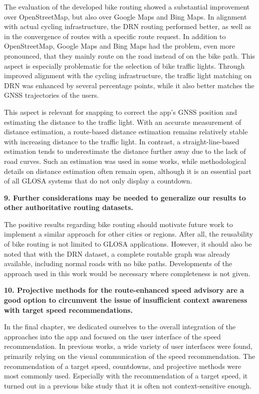 The evaluation of the developed bike routing showed a substantial improvement over OpenStreetMap, but also over Google Maps and Bing Maps. In alignment with actual cycling infrastructure, the DRN routing performed better, as well as in the convergence of routes with a specific route request. In addition to OpenStreetMap, Google Maps and Bing Maps had the problem, even more pronounced, that they mainly route on the road instead of on the bike path. This aspect is especially problematic for the selection of bike traffic lights. Through improved alignment with the cycling infrastructure, the traffic light matching on DRN was enhanced by several percentage points, while it also better matches the GNSS trajectories of the users. 

This aspect is relevant for snapping to correct the app's GNSS position and estimating the distance to the traffic light. With an accurate measurement of distance estimation, a route-based distance estimation remains relatively stable with increasing distance to the traffic light. In contrast, a straight-line-based estimation tends to underestimate the distance further away due to the lack of road curves. Such an estimation was used in some works, while methodological details on distance estimation often remain open, although it is an essential part of all GLOSA systems that do not only display a countdown.

\textbf{\color{cidarkblue}9. Further considerations may be needed to generalize our results to other authoritative routing datasets.} 

The positive results regarding bike routing should motivate future work to implement a similar approach for other cities or regions. After all, the reusability of bike routing is not limited to GLOSA applications. However, it should also be noted that with the DRN dataset, a complete routable graph was already available, including normal roads with no bike paths. Developments of the approach used in this work would be necessary where completeness is not given.

\textbf{\color{cidarkblue}10. Projective methods for the route-enhanced speed advisory are a good option to circumvent the issue of insufficient context awareness with target speed recommendations.} 

In the final chapter, we dedicated ourselves to the overall integration of the approaches into the app and focused on the user interface of the speed recommendation. In previous works, a wide variety of user interfaces were found, primarily relying on the visual communication of the speed recommendation. The recommendation of a target speed, countdowns, and projective methods were most commonly used. Especially with the recommendation of a target speed, it turned out in a previous bike study that it is often not context-sensitive enough. 

